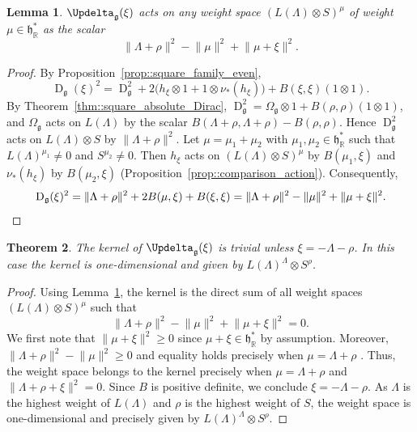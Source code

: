 \documentclass[11pt]{amsart}
\newcommand{\Dirac}{\operatorname{D}}
\def\Laplace{{\Updelta_{\gg}(\xi)}}
\def\RR{{\mathbb R}}
\def\hh{{\mathfrak h}}
\def\gg{{\mathfrak{g}}}
\newcommand{\norm}[1]{\lVert#1\rVert}
\theoremstyle{plain}
\newtheorem{theorem}{Theorem}
\newtheorem{lemma}[theorem]{Lemma}
\theoremstyle{remark}
\theoremstyle{definition}
\numberwithin{equation}{section}
\theoremstyle{remark}
\begin{document}
\begin{lemma} \label{lemm::action_Laplace_weight_space}
 $\Laplace$ acts on any weight space $(L(\Lambda)\otimes S)^{\mu}$ of weight $\mu \in \hh_{\RR}^{\ast}$ as the scalar 
\[
\norm{\Lambda+\rho}^{2}-\norm{\mu}^{2}+\norm{\mu+\xi}^{2}.
\]
\end{lemma}

\begin{proof}
By Proposition~\ref{prop::square_family_even},
\[
\Dirac_{\gg}(\xi)^{2}
=\Dirac_{\gg}^{2}+2\bigl(h_{\xi}\otimes1+1\otimes\nu_{\ast}(h_{\xi})\bigr)
+B(\xi,\xi)(1\otimes1).
\]
By Theorem~\ref{thm::square_absolute_Dirac},
$\Dirac_{\gg}^{2}=\Omega_{\gg}\otimes1+B(\rho,\rho)(1\otimes1)$, and $\Omega_{\gg}$
acts on $L(\Lambda)$ by the scalar
$B(\Lambda+\rho,\Lambda+\rho)-B(\rho,\rho)$. Hence $\Dirac_{\gg}^{2}$ acts on
$L(\Lambda)\otimes S$ by $\|\Lambda+\rho\|^{2}$. Let $\mu=\mu_{1}+\mu_{2}$ with
$\mu_{1},\mu_{2}\in\hh_{\RR}^{\ast}$ such that $L(\Lambda)^{\mu_{1}}\neq0$ and
$S^{\mu_{2}}\neq0$. Then $h_{\xi}$ acts on $(L(\Lambda)\otimes S)^{\mu}$ by
$B(\mu_{1},\xi)$ and $\nu_{\ast}(h_{\xi})$ by $B(\mu_{2},\xi)$
(Proposition~\ref{prop::comparison_action}). Consequently,
\[
\Dirac_{\gg}(\xi)^{2}
=\|\Lambda+\rho\|^{2}+2B(\mu,\xi)+B(\xi,\xi)
=\|\Lambda+\rho\|^{2}-\|\mu\|^{2}+\|\mu+\xi\|^{2}. \qedhere
\]
\end{proof}

\begin{theorem} \label{thm::main_theorem_families_complex_simple_even_case}
 The kernel of $\Laplace$ is trivial unless $\xi=-\Lambda-\rho$. In this case the kernel is one-dimensional and given by $L(\Lambda)^{\Lambda} \otimes S^{\rho}$.
\end{theorem}

\begin{proof}
 Using Lemma~\ref{lemm::action_Laplace_weight_space}, the kernel is the direct sum of all weight spaces $(L(\Lambda)\otimes S)^{\mu}$ such that 
 \[
 \norm{\Lambda+\rho}^{2}-\norm{\mu}^{2}+\norm{\mu+\xi}^{2}=0.
 \]
 We first note that $\norm{\mu+\xi}^{2}\geq 0$ since $\mu+\xi \in \hh_{\RR}^{\ast}$ by assumption. Moreover, $\norm{\Lambda+\rho}^{2}-\norm{\mu}^{2}\geq 0$ and equality holds precisely when $\mu=\Lambda+\rho$ \cite[Proposition 11.4]{Kac_infinite}. Thus, the weight space belongs to the kernel precisely when $\mu=\Lambda+\rho$ and $\norm{\Lambda+\rho+\xi}^{2}=0$. Since $B$ is positive definite, we conclude $\xi=- \Lambda-\rho$. As $\Lambda$ is the highest weight of $L(\Lambda)$ and $\rho$ is the highest weight of $S$, the weight space is one-dimensional and precisely given by $L(\Lambda)^{\Lambda}\otimes S^{\rho}$. 
\end{proof}
\end{document}
